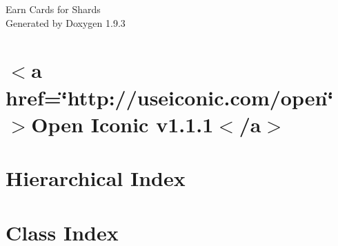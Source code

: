 \documentclass[twoside]{book}
\newcommand{\+}{\discretionary{\mbox{\scriptsize$\hookleftarrow$}}{}{}}
\newcommand{\clearemptydoublepage}{%
    \newpage{\pagestyle{empty}\cleardoublepage}%
  }
\begin{document}
  \raggedbottom
    \hypersetup{pageanchor=false,
                bookmarksnumbered=true,
                pdfencoding=unicode
               }
  \begin{titlepage}
  \vspace*{7cm}
  \begin{center}%
  {\Large Earn Cards for Shards}\\
  \vspace*{1cm}
  {\large Generated by Doxygen 1.9.3}\\
  \end{center}
  \end{titlepage}
  \clearemptydoublepage
  \tableofcontents
  \clearemptydoublepage
  \hypersetup{pageanchor=true}
\chapter{\texorpdfstring{$<$}{<}a href=\char`\"{}http\+://useiconic.\+com/open\char`\"{} \texorpdfstring{$>$}{>}Open Iconic v1.1.1\texorpdfstring{$<$}{<}/a\texorpdfstring{$>$}{>}}
\label{md__c_s320__designing_gin_rummy__earn_shards_for_cards__earn_shards_for_cards__client_wwwroot_css_open_iconic__r_e_a_d_m_e}

\chapter{Hierarchical Index}

\chapter{Class Index}

\end{document}
